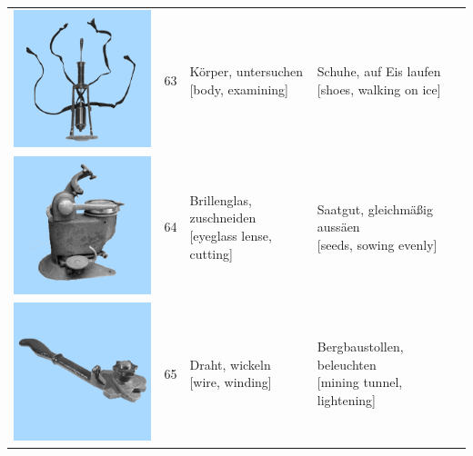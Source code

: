 \documentclass[
  english,
  man,floatsintext]{apa7}
\begin{document}
\begin{center}
\begin{ThreePartTable}
{\begin{longtable}{llll}
\includegraphics[valign=c, scale=0.23]{../materials/unfamiliar/63.png} & 63 & \makecell[l]{Körper, untersuchen\\{[body, examining]}} & \makecell[l]{Schuhe, auf Eis laufen\\{[shoes, walking on ice]}}\\
\includegraphics[valign=c, scale=0.23]{../materials/unfamiliar/64.png} & 64 & \makecell[l]{Brillenglas, zuschneiden\\{[eyeglass lense, cutting]}} & \makecell[l]{Saatgut, gleichmäßig aussäen\\{[seeds, sowing evenly]}}\\
\includegraphics[valign=c, scale=0.23]{../materials/unfamiliar/65.png} & 65 & \makecell[l]{Draht, wickeln\\{[wire, winding]}} & \makecell[l]{Bergbaustollen, beleuchten\\{[mining tunnel, lightening]}}\\

\end{longtable}}
\end{ThreePartTable}
\end{center}
\end{document}
